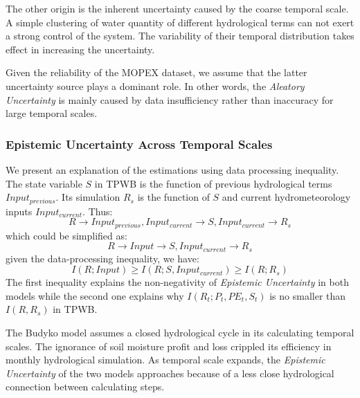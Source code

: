 \documentclass[draft,wrr]{AGUTeX}
\begin{document}
\begin{article}
The other origin is the inherent uncertainty caused by the coarse temporal scale. A simple clustering of water quantity of different hydrological terms can not exert a strong control of the system. The variability of their temporal distribution takes effect in increasing the uncertainty. 

Given the reliability of the MOPEX dataset, we assume that the latter uncertainty source plays a dominant role. In other words, the \emph{Aleatory Uncertainty} is mainly caused by data insufficiency rather than inaccuracy for large temporal scales. 
\subsubsection{Epistemic Uncertainty Across Temporal Scales}
We present an explanation of the estimations using data processing inequality. The state variable $S$ in TPWB is the function of previous hydrological terms $Input_{previous}$. Its simulation $R_s$ is the function of $S$ and current hydrometeorology inputs $Input_{current}$. Thus:
\begin{equation}
R \rightarrow Input_{previous},Input_{current} \rightarrow S,Input_{current} \rightarrow R_s
\end{equation}
which could be simplified  as:
 \begin{equation}
R \rightarrow Input \rightarrow S,Input_{current} \rightarrow R_s
\end{equation}
given the data-processing inequality, we have:
\begin{equation}
\label{ie2}
I(R;Input)\geq I(R;S,Input_{current}) \geq I(R;R_s)
\end{equation}
The first inequality explains the non-negativity of \emph{Epistemic Uncertainty} in both models while the second one explains why $I(R_t;P_t,PE_t,S_t)$ is no smaller than $I(R,R_s)$ in TPWB.

The Budyko model assumes a closed hydrological cycle in its calculating temporal scales. The ignorance of soil moisture profit and loss crippled its efficiency in monthly hydrological simulation. As temporal scale expands, the \emph{Epistemic Uncertainty} of the two models approaches because of a less close hydrological connection between calculating steps.
\fi

\end{article}
\end{document}

